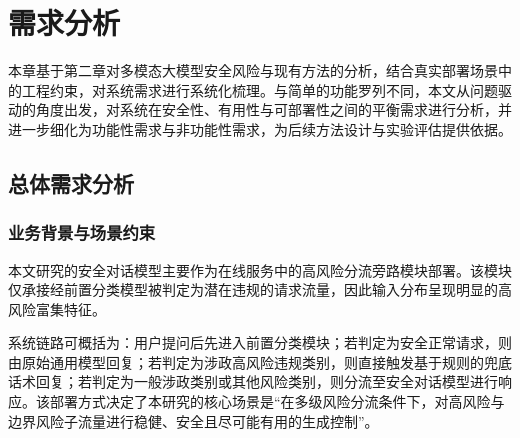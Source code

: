 \chapter{需求分析}

本章基于第二章对多模态大模型安全风险与现有方法的分析，结合真实部署场景中的工程约束，对系统需求进行系统化梳理。与简单的功能罗列不同，本文从问题驱动的角度出发，对系统在安全性、有用性与可部署性之间的平衡需求进行分析，并进一步细化为功能性需求与非功能性需求，为后续方法设计与实验评估提供依据。

\section{总体需求分析}

\subsection{业务背景与场景约束}

本文研究的安全对话模型主要作为在线服务中的高风险分流旁路模块部署。该模块仅承接经前置分类模型被判定为潜在违规的请求流量，因此输入分布呈现明显的高风险富集特征。

系统链路可概括为：用户提问后先进入前置分类模块；若判定为安全正常请求，则由原始通用模型回复；若判定为涉政高风险违规类别，则直接触发基于规则的兜底话术回复；若判定为一般涉政类别或其他风险类别，则分流至安全对话模型进行响应。该部署方式决定了本研究的核心场景是“在多级风险分流条件下，对高风险与边界风险子流量进行稳健、安全且尽可能有用的生成控制”。

